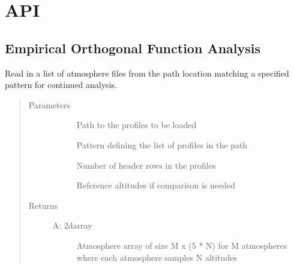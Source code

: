 \documentclass[letterpaper,10pt,english]{sphinxmanual}
\begin{document}
\section{API}
\label{\detokenize{stochprop:api}}\label{\detokenize{stochprop:id1}}\label{\detokenize{stochprop::doc}}

\subsection{Empirical Orthogonal Function Analysis}
\label{\detokenize{stochprop.eofs:empirical-orthogonal-function-analysis}}\label{\detokenize{stochprop.eofs::doc}}\label{\detokenize{stochprop.eofs:module-stochprop.eofs}}

\begin{fulllineitems}
\label{\detokenize{stochprop.eofs:stochprop.eofs.build_atmo_matrix}}
Read in a list of atmosphere files from the path location
matching a specified pattern for continued analysis.
\begin{quote}\begin{description}
\item[{Parameters}] \leavevmode\begin{description}
\item[{}] \leavevmode
Path to the profiles to be loaded

\item[{}] \leavevmode
Pattern defining the list of profiles in the path

\item[{}] \leavevmode
Number of header rows in the profiles

\item[{}] \leavevmode
Reference altitudes if comparison is needed

\end{description}

\item[{Returns}] \leavevmode\begin{description}
\item[{A: 2darray}] \leavevmode
Atmosphere array of size M x (5 * N) for M atmospheres where each atmosphere samples N altitudes

\end{description}

\end{description}\end{quote}

\end{fulllineitems}
\end{document}
